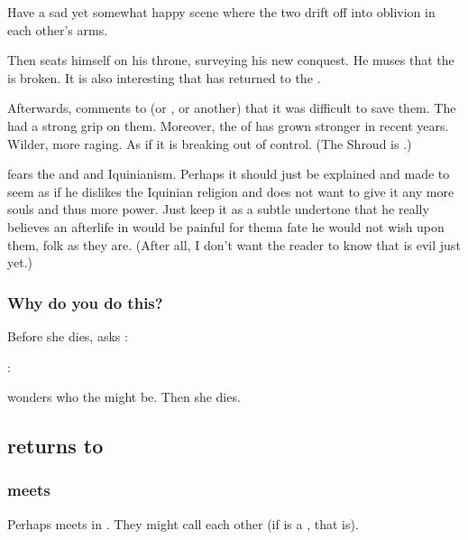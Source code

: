 Have a sad yet somewhat happy scene where the two drift off into oblivion in each other's arms. 

Then \Psyrex{} seats himself on his throne, surveying his new conquest. He muses that the \charade{} is broken. It is also interesting that \Ishnaruchaefir{} has returned to the \secretwar. 

Afterwards, \Psyrex{} comments to \Secherdamon{} (or \Nzessuacrith, or another) that it was difficult to save them. 
The \sephiroth{} had a strong grip on them. 
Moreover, the  of \Iquin{} has grown stronger in recent years. 
Wilder, more raging. 
As if it is breaking out of control. 
(The Shroud is .) 

\Psyrex{} fears the \sephiroth{} and \iquin{} and Iquinianism. 
Perhaps it should just be explained and made to seem as if he dislikes the Iquinian religion and does not want to give it any more souls and thus more power. 
Just keep it as a subtle undertone that he really believes an afterlife in \iquin{} would be painful for them\dash a fate he would not wish upon them, \honourable folk as they are. 
(After all, I don't want the reader to know that \Iquin{} is evil just yet.)





\subsubsection{Why do you do this?}
Before she dies, \Tiroco{} asks \Psyrex: 

\Psyrex: 

\Tiroco{} wonders who the \pps{\humans}  might be. Then she dies. 







\subsection{\Ishnaruchaefir returns to \Malcur}





\subsubsection{\Criseis meets \Psyrex}
Perhaps \Criseis meets \Psyrex in \Malcur.
They might call each other  (if \Psyrex is a \scatha, that is). 





